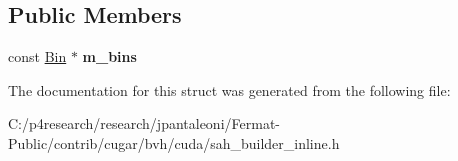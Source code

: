 \subsection*{Public Members}
\begin{DoxyCompactItemize}
\item 
\mbox{\label{structnih_1_1cuda_1_1sah_1_1_bbox__compressor_a78323594f0e153df8c53da4238da5b03}} 
const \hyperlink{structnih_1_1cuda_1_1sah_1_1_bin}{Bin} $\ast$ {\bfseries m\+\_\+bins}
\end{DoxyCompactItemize}


The documentation for this struct was generated from the following file\+:\begin{DoxyCompactItemize}
\item 
C\+:/p4research/research/jpantaleoni/\+Fermat-\/\+Public/contrib/cugar/bvh/cuda/sah\+\_\+builder\+\_\+inline.\+h\end{DoxyCompactItemize}
